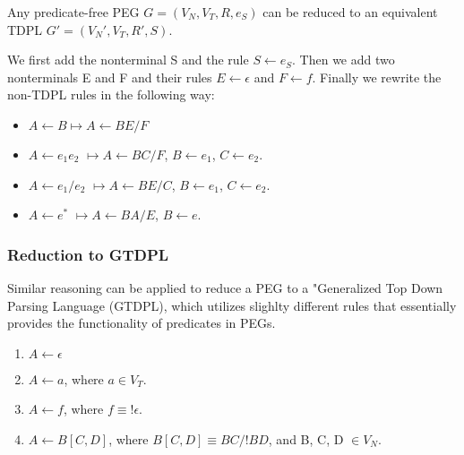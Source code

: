 \begin{frame}
	Any predicate-free PEG $G = (V_N,V_T,R,e_S)$ can be reduced  to an equivalent TDPL $G' = (V_N',V_T,R',S)$.
	
	\begin{block}{}
		We first add the nonterminal S and the rule $S \leftarrow e_S$. Then we add two nonterminals E and F and their rules $E \leftarrow \epsilon$ and $F \leftarrow f$. Finally we rewrite the non-TDPL rules in the following way:\begin{itemize}
			\item $A \leftarrow B \longmapsto  A \leftarrow BE / F$
			\item $A \leftarrow e_1e_2$ $\longmapsto A \leftarrow BC / F$, $ B \leftarrow e_1$, $C \leftarrow e_2$.
			\item $A \leftarrow e_1/e_2$ $\longmapsto A \leftarrow BE/ C$, $ B \leftarrow e_1$, $C \leftarrow e_2$.
			\item $A \leftarrow e^*$ $\longmapsto A \leftarrow BA/ E$, $ B \leftarrow e$.
		\end{itemize}
	\end{block}
\end{frame}

\begin{frame}
	\frametitle{Reduction to GTDPL }
	Similar reasoning can be applied to reduce a PEG to a "Generalized Top Down Parsing Language (GTDPL), which utilizes slighlty different rules that essentially provides the functionality of predicates in PEGs.
	
	\begin{block}{}
			\begin{enumerate}
			\item $A \leftarrow \epsilon$
			\item $A \leftarrow a$, where $a \in V_T$.
			\item $A \leftarrow f$, where $f \equiv !\epsilon$.
			\item $A \leftarrow B[C,D]$, where $B[C,D] \equiv BC / !BD$, and  B, C, D $\in V_N$.
		\end{enumerate}
	\end{block}
\end{frame}

